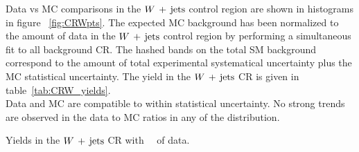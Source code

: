 \indent Data vs MC comparisons in the $W\,+\,\mathrm{jets}$ control region are shown in histograms in figure ~\ref{fig:CRWpts}.  The expected MC background has been normalized to the amount of data in the $W\,+\,\mathrm{jets}$ control region by performing a simultaneous fit to all background CR.  The hashed bands on the total SM background correspond to the amount of total experimental systematical uncertainty plus the MC statistical uncertainty.  The yield in the $W\,+\,\mathrm{jets}$ CR is given in table~\ref{tab:CRW_yields}.  \\

\indent  Data and MC are compatible to within statistical uncertainty.  No strong trends are observed in the data to MC ratios in any of the distribution. \\
\begin{table}[!htb]
  \centering
  
  \caption{Yields in the $W\,+\,\mathrm{jets}$ CR with \intlumi\ \ifb\ of data.  }
  \label{tab:CRW_yields}
\end{table}

